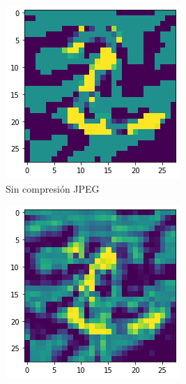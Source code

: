 \begin{figure}[h!]
\centering
\begin{subfigure}[t]{0.22\textwidth}
\centering
    \includegraphics[width=\textwidth]{images/jpeg/fgsm_Le.png}
    \caption{Sin compresión JPEG}
\end{subfigure}
\hspace{1em}
\begin{subfigure}[t]{0.22\textwidth}
\centering
    \includegraphics[width=\textwidth]{images/jpeg/fgsm_jpeg20_Le.png}

\end{subfigure}
\end{figure}

